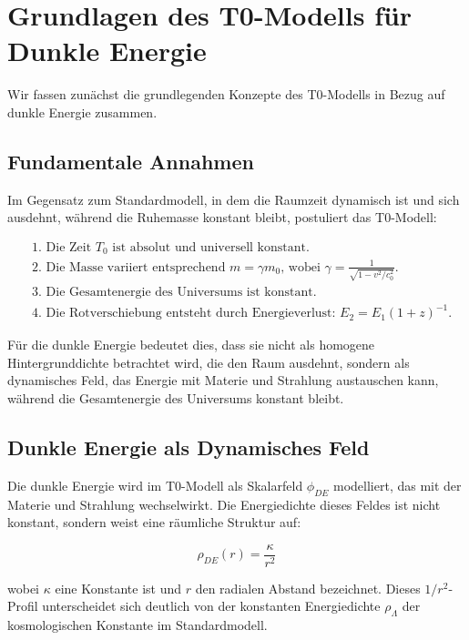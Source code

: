 \documentclass[a4paper,12pt]{article}
\theoremstyle{definition}
\theoremstyle{remark}
\begin{document}
	\section{Grundlagen des T0-Modells für Dunkle Energie}
	Wir fassen zunächst die grundlegenden Konzepte des T0-Modells in Bezug auf dunkle Energie zusammen.
	
	\subsection{Fundamentale Annahmen}
	Im Gegensatz zum Standardmodell, in dem die Raumzeit dynamisch ist und sich ausdehnt, während die Ruhemasse konstant bleibt, postuliert das T0-Modell:
	
	\begin{tcolorbox}[colback=blue!5!white,colframe=blue!75!black,title=Grundannahmen des T0-Modells]
		\begin{align}
			&\text{1. Die Zeit $T_0$ ist absolut und universell konstant.} \\
			&\text{2. Die Masse variiert entsprechend $m = \gamma m_0$, wobei $\gamma = \frac{1}{\sqrt{1-v^2/c_0^2}}$.} \\
			&\text{3. Die Gesamtenergie des Universums ist konstant.} \\
			&\text{4. Die Rotverschiebung entsteht durch Energieverlust: $E_2 = E_1(1+z)^{-1}$.}
		\end{align}
	\end{tcolorbox}
	
	Für die dunkle Energie bedeutet dies, dass sie nicht als homogene Hintergrunddichte betrachtet wird, die den Raum ausdehnt, sondern als dynamisches Feld, das Energie mit Materie und Strahlung austauschen kann, während die Gesamtenergie des Universums konstant bleibt.
	
	\subsection{Dunkle Energie als Dynamisches Feld}
	Die dunkle Energie wird im T0-Modell als Skalarfeld $\phi_{DE}$ modelliert, das mit der Materie und Strahlung wechselwirkt. Die Energiedichte dieses Feldes ist nicht konstant, sondern weist eine räumliche Struktur auf:
	
	\begin{equation}
		\rho_{DE}(r) = \frac{\kappa}{r^2}
	\end{equation}
	
	wobei $\kappa$ eine Konstante ist und $r$ den radialen Abstand bezeichnet. Dieses $1/r^2$-Profil unterscheidet sich deutlich von der konstanten Energiedichte $\rho_\Lambda$ der kosmologischen Konstante im Standardmodell.
	
\end{document}
